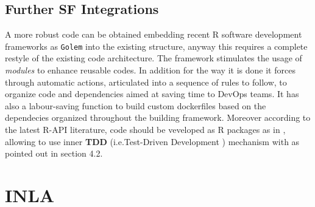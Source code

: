 \documentclass[
  12pt,
  a4paper,
  oneside]{book}
\newcommand{\passthrough}[1]{#1}
\theoremstyle{definition}
\theoremstyle{definition}
\theoremstyle{definition}
\theoremstyle{remark}
\begin{document}
\hypertarget{further-sf-integrations}{%
\section{Further SF Integrations}\label{further-sf-integrations}}

A more robust code can be obtained embedding recent R software development frameworks as \passthrough{\lstinline!Golem!} \citet{colin_fay_2020} into the existing structure, anyway this requires a complete restyle of the existing code architecture. The framework stimulates the usage of \emph{modules} to enhance reusable codes. In addition for the way it is done it forces through automatic actions, articulated into a sequence of rules to follow, to organize code and dependencies aimed at saving time to DevOps teams. It has also a labour-saving function to build custom dockerfiles based on the dependecies organized throughout the building framework.
Moreover according to the latest R-API literature, code should be veveloped as R packages as in \citet{plungr}, allowing to use inner \textbf{TDD} (i.e.Test-Driven Development \citet{TDD_2004}) mechanism with \citet{testthat} as pointed out in \citet{colin_fay_2020} section 4.2.

\hypertarget{inla}{%
\chapter{INLA}\label{inla}}
\end{document}
